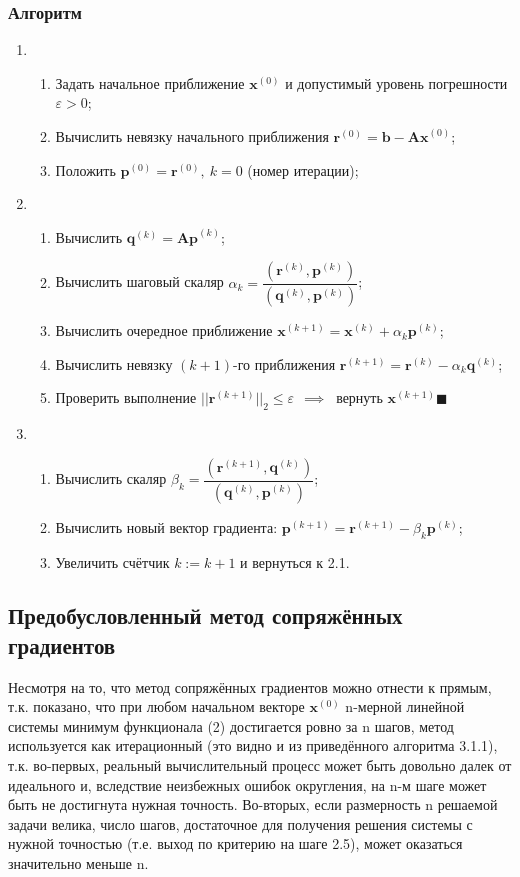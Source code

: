 \subsubsection{Алгоритм}
\begin{enumerate}
    \item \begin{enumerate}
        \item Задать начальное приближение $\mathbf{x}^{(0)}$ и допустимый уровень погрешности $\varepsilon>0$;
        \item Вычислить невязку начального приближения $\mathbf{r}^{(0)}=\mathbf{b-Ax}^{(0)}$;
        \item Положить $\mathbf{p}^{(0)}=\mathbf{r}^{(0)},~k=0$ (номер итерации);
    \end{enumerate}
    \item \begin{enumerate}
        \item Вычислить $\mathbf{q}^{(k)}=\mathbf{Ap}^{(k)}$;
        \item Вычислить шаговый скаляр $\alpha_k=\dfrac{(\mathbf{r}^{(k)}, \mathbf{p}^{(k)})}{(\mathbf{q}^{(k)}, \mathbf{p}^{(k)})}$;
        \item Вычислить очередное приближение $\mathbf{x}^{(k+1)}=\mathbf{x}^{(k)}+\alpha_k\mathbf{p}^{(k)}$;
        \item Вычислить невязку $(k+1)$-го приближения $\mathbf{r}^{(k+1)}=\mathbf{r}^{(k)}-\alpha_k\mathbf{q}^{(k)}$;
        \item Проверить выполнение $||\mathbf{r}^{(k+1)}||_2 \le \varepsilon ~~\implies ~$ вернуть $\mathbf{x}^{(k+1)} \blacksquare$
    \end{enumerate}
    \item \begin{enumerate}
        \item Вычислить скаляр $\beta_k=\dfrac{(\mathbf{r}^{(k+1)}, \mathbf{q}^{(k)})}{(\mathbf{q}^{(k)}, \mathbf{p}^{(k)})}$;
        \item Вычислить новый вектор градиента: $\mathbf{p}^{(k+1)}=\mathbf{r}^{(k+1)}-\beta_k\mathbf{p}^{(k)}$;
        \item Увеличить счётчик $k:=k+1$ и вернуться к 2.1.
    \end{enumerate}
\end{enumerate}

\subsection{Предобусловленный метод сопряжённых градиентов}
Несмотря на то, что метод сопряжённых градиентов можно отнести к прямым, т.к. показано, что при любом начальном векторе $\mathbf{x}^{(0)}$ n-мерной линейной системы минимум функционала (2) достигается ровно за n шагов, метод используется как итерационный (это видно и из приведённого алгоритма 3.1.1), т.к. во-первых, реальный вычислительный процесс может быть довольно далек от идеального и, вследствие неизбежных ошибок округления, на n-м шаге может быть не достигнута нужная точность. Во-вторых, если размерность n решаемой задачи велика, число шагов, достаточное для получения решения системы с нужной точностью (т.е. выход по критерию на шаге 2.5), может оказаться значительно меньше n.

